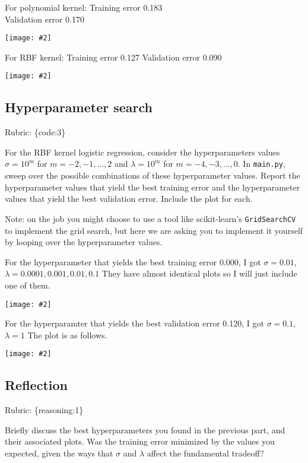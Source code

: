 \documentclass{article}
\def\rubric#1{\gre{Rubric: \{#1\}}}{}
\def\blu#1{{\color{blu}#1}}
\def\gre#1{{\color{gre}#1}}
\def\red#1{{\color{red}#1}}
\newcommand{\centerfig}[2]{\begin{center}\texttt{[image: \#2]}\end{center}}
\begin{document}
 \red{For polynomial kernel: \newline
Training error 0.183 \\
Validation error 0.170 \\
\centerfig{.7}{./figs/logRegPolynomialKernel.png}
}
\red{
For RBF kernel: \newline
Training error 0.127 \newline
Validation error 0.090}

\centerfig{.7}{./figs/logRegRBFKernel.png}



\subsection{Hyperparameter search}
\rubric{code:3}

For the RBF kernel logistic regression, consider the hyperparameters values $\sigma=10^m$ for $m=-2,-1,\ldots,2$ and $\lambda=10^m$ for $m=-4,-3,\ldots,0$. \blu{In \texttt{main.py}, sweep over the possible combinations of these hyperparameter values. Report the hyperparameter values that yield the best training error and the hyperparameter values that yield the best validation error. Include the plot for each.}

Note: on the job you might choose to use a tool like scikit-learn's \texttt{GridSearchCV} to implement the grid search, but here we are asking you to implement it yourself by looping over the hyperparameter values.

\red{For the hyperparameter that yields the best training error 0.000, I got $\sigma = 0.01$, $\lambda = 0.0001, 0.001, 0.01, 0.1$
They have almost identical plots so I will just include one of them.
}

\centerfig{.7}{./figs/BestTrainingError.png}

\red{For the hyperparamter that yields the best validation error 0.120, I got $\sigma = 0.1$, $\lambda = 1$ The plot is as follows.}

\centerfig{.7}{./figs/BestValidationError.png}

\subsection{Reflection}
\rubric{reasoning:1}

Briefly discuss the best hyperparameters you found in the previous part, and their associated plots. Was the training error minimized by the values you expected, given the ways that $\sigma$ and $\lambda$ affect the fundamental tradeoff?
\end{document}
